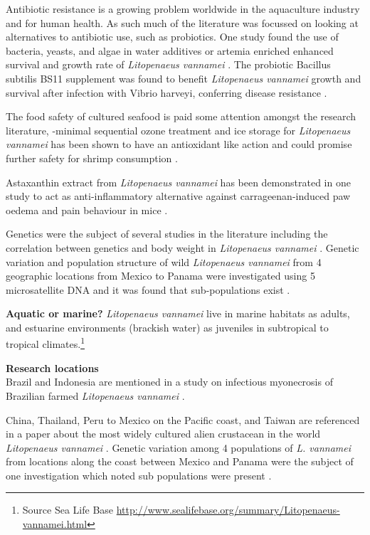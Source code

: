 \documentclass[]{book}
\let\rmarkdownfootnote\footnote%
\def\footnote{\protect\rmarkdownfootnote}
\theoremstyle{definition}
\theoremstyle{definition}
\theoremstyle{definition}
\theoremstyle{remark}
\begin{document}
Antibiotic resistance is a growing problem worldwide in the aquaculture
industry and for human health. As such much of the literature was
focussed on looking at alternatives to antibiotic use, such as
probiotics. One study found the use of bacteria, yeasts, and algae in
water additives or artemia enriched enhanced survival and growth rate of
\emph{Litopenaeus vannamei} \citep{Nimrat_2011}. The probiotic Bacillus
subtilis BS11 supplement was found to benefit \emph{Litopenaeus
vannamei} growth and survival after infection with Vibrio harveyi,
conferring disease resistance \citep{Sapcharoen_2013}.

The food safety of cultured seafood is paid some attention amongst the
research literature, -minimal sequential ozone treatment and ice storage
for \emph{Litopenaeus vannamei} has been shown to have an antioxidant
like action and could promise further safety for shrimp consumption
\citep{Okpala_2014}.

Astaxanthin extract from \emph{Litopenaeus vannamei} has been
demonstrated in one study to act as anti-inflammatory alternative
against carrageenan-induced paw oedema and pain behaviour in mice
\citep{Kuedo_2016}.

Genetics were the subject of several studies in the literature including
the correlation between genetics and body weight in \emph{Litopenaeus
vannamei} \citep{Glenn_2005}. Genetic variation and population structure
of wild \emph{Litopenaeus vannamei} from 4 geographic locations from
Mexico to Panama were investigated using 5 microsatellite DNA and it was
found that sub-populations exist \citep{Valles_Jimenez_2004}.

\textbf{Aquatic or marine?} \emph{Litopenaeus vannamei} live in marine
habitats as adults, and estuarine environments (brackish water) as
juveniles in subtropical to tropical climates.\footnote{Source Sea Life
  Base
  \url{http://www.sealifebase.org/summary/Litopenaeus-vannamei.html}}

\textbf{Research locations}\\
Brazil and Indonesia are mentioned in a study on infectious myonecrosis
of Brazilian farmed \emph{Litopenaeus vannamei} \citep{Silva_2010}.

China, Thailand, Peru to Mexico on the Pacific coast, and Taiwan are
referenced in a paper about the most widely cultured alien crustacean in
the world \emph{Litopenaeus vannamei} \citep{Liao_2011}. Genetic
variation among 4 populations of \emph{L. vannamei} from locations along
the coast between Mexico and Panama were the subject of one
investigation which noted sub populations were present
\citep{Valles_Jimenez_2004}.
\end{document}
